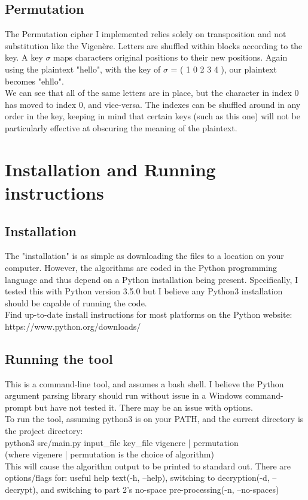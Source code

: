 \documentclass[12pt,oneside,a4paper]{article}
\begin{document}
\subsection*{Permutation}
The Permutation cipher I implemented relies solely on transposition and not 
substitution like the Vigenère.  Letters are shuffled within blocks according 
to the key.  A key $\sigma$ maps characters original positions to their new 
positions.  Again using the plaintext "hello", with the key of $\sigma$ = 
( 1 0 2 3 4 ), our plaintext becomes "ehllo". \\

We can see that all of the same letters are in place, but the character in 
index 0 has moved to index 0, and vice-versa.  The indexes can be shuffled 
around in any order in the key, keeping in mind that certain keys (such as 
this one) will not be particularly effective at obscuring the meaning of the 
plaintext.


\section*{Installation and Running instructions}
\subsection*{Installation}
The "installation" is as simple as downloading the files to a location on your 
computer.  However, the algorithms are coded in the Python programming 
language and thus depend on a Python installation being present.  
Specifically, I tested this with Python version 3.5.0 but I believe any 
Python3 installation should be capable of running the code. \\

Find up-to-date install instructions for most platforms on the Python 
website: \\
{https://www.python.org/downloads/}


\subsection*{Running the tool}
This is a command-line tool, and assumes a bash shell.  I believe the Python 
argument parsing library should run without issue in a Windows command-prompt 
but have not tested it.  There may be an issue with options. \\

To run the tool, assuming python3 is on your PATH, and the current directory 
is the project directory: \\
python3 src/main.py input\_file key\_file {vigenere | permutation} \\
(where {vigenere | permutation} is the choice of algorithm) \\

This will cause the algorithm output to be printed to standard out. There are 
options/flags for:  useful help text(-h, --help), switching to 
decryption(-d, --decrypt), and switching to part 2's no-space 
pre-processing(-n, --no-spaces)
\end{document}
